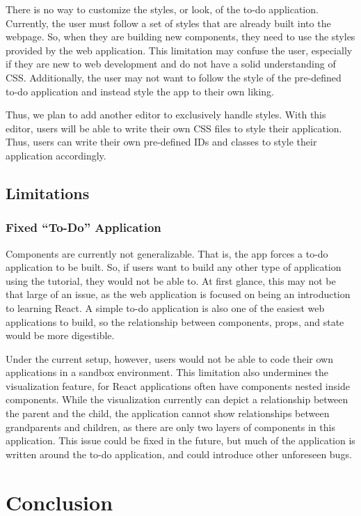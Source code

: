 \documentclass[11pt]{article}
\begin{document}
There is no way to customize the styles, or look, of the to-do application. Currently, the user must follow a set of styles that are already built into the webpage. So, when they are building new components, they need to use the styles provided by the web application. This limitation may confuse the user, especially if they are new to web development and do not have a solid understanding of CSS. Additionally, the user may not want to follow the style of the pre-defined to-do application and instead style the app to their own liking.

Thus, we plan to add another editor to exclusively handle styles. With this editor, users will be able to write their own CSS files to style their application. Thus, users can write their own pre-defined IDs and classes to style their application accordingly.

\subsection*{Limitations}

\subsubsection*{Fixed ``To-Do'' Application}

Components are currently not generalizable. That is, the app forces a to-do application to be built. So, if users want to build any other type of application using the tutorial, they would not be able to. At first glance, this may not be that large of an issue, as the web application is focused on being an introduction to learning React. A simple to-do application is also one of the easiest web applications to build, so the relationship between components, props, and state would be more digestible.

Under the current setup, however, users would not be able to code their own applications in a sandbox environment. This limitation also undermines the visualization feature, for React applications often have components nested inside components. While the visualization currently can depict a relationship between the parent and the child, the application cannot show relationships between grandparents and children, as there are only two layers of components in this application. This issue could be fixed in the future, but much of the application is written around the to-do application, and could introduce other unforeseen bugs.

\section{Conclusion}
\end{document}
